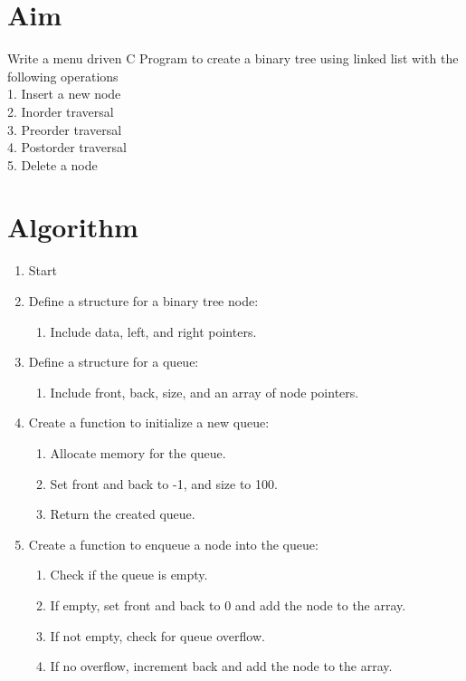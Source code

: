 
\section{Aim}
Write a menu driven C Program to create a binary tree using linked list with the following
operations
\\1. Insert a new node
\\2. Inorder traversal
\\3. Preorder traversal
\\4. Postorder traversal
\\5. Delete a node
\section{Algorithm}
 {\selectfont

  \begin{enumerate}[label=\arabic*.]
    \item Start

    \item Define a structure for a binary tree node:
          \begin{enumerate}[label=\arabic{enumi}.\arabic*.]
            \item Include data, left, and right pointers.
          \end{enumerate}

    \item Define a structure for a queue:
          \begin{enumerate}[label=\arabic{enumi}.\arabic*.]
            \item Include front, back, size, and an array of node pointers.
          \end{enumerate}

    \item Create a function to initialize a new queue:
          \begin{enumerate}[label=\arabic{enumi}.\arabic*.]
            \item Allocate memory for the queue.
            \item Set front and back to -1, and size to 100.
            \item Return the created queue.
          \end{enumerate}

    \item Create a function to enqueue a node into the queue:
          \begin{enumerate}[label=\arabic{enumi}.\arabic*.]
            \item Check if the queue is empty.
            \item If empty, set front and back to 0 and add the node to the array.
            \item If not empty, check for queue overflow.
            \item If no overflow, increment back and add the node to the array.
          \end{enumerate}


\end{enumerate}}
